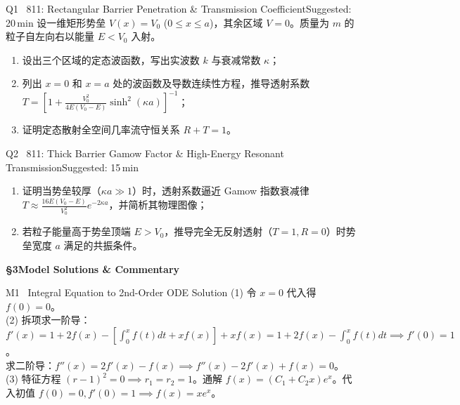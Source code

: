 \documentclass[a4paper,11pt]{article}
\begin{document}
\vspace{3pt}

\begin{problem}{Q1 \textbar\ 811: Rectangular Barrier Penetration \& Transmission Coefficient}{Suggested: 20\,min}
设一维矩形势垒 $V(x) = V_0$ ($0 \le x \le a$)，其余区域 $V=0$。质量为 $m$ 的粒子自左向右以能量 $E < V_0$ 入射。
\begin{enumerate}[leftmargin=1.5em,itemsep=1pt,topsep=1pt]
  \item 设出三个区域的定态波函数，写出实波数 $k$ 与衰减常数 $\kappa$；
  \item 列出 $x=0$ 和 $x=a$ 处的波函数及导数连续性方程，推导透射系数 $T = \left[1 + \frac{V_0^2}{4E(V_0-E)}\sinh^2(\kappa a)\right]^{-1}$；
  \item 证明定态散射全空间几率流守恒关系 $R + T = 1$。
\end{enumerate}
\end{problem}

\vspace{3pt}

\begin{problem}{Q2 \textbar\ 811: Thick Barrier Gamow Factor \& High-Energy Resonant Transmission}{Suggested: 15\,min}
\begin{enumerate}[leftmargin=1.5em,itemsep=1pt,topsep=1pt]
  \item 证明当势垒较厚（$\kappa a \gg 1$）时，透射系数逼近 Gamow 指数衰减律 $T \approx \frac{16E(V_0-E)}{V_0^2}e^{-2\kappa a}$，并简析其物理图像；
  \item 若粒子能量高于势垒顶端 $E > V_0$，推导完全无反射透射（$T=1, R=0$）时势垒宽度 $a$ 满足的共振条件。
\end{enumerate}
\end{problem}

\clearpage

{\Large\sffamily\bfseries\color{navy} \S 3\quad Model Solutions \& Commentary}

\vspace{2pt}

\begin{solution}{M1 \textperiodcentered\ Integral Equation to 2nd-Order ODE Solution}
(1) 令 $x=0$ 代入得 $f(0) = 0$。\\
(2) 拆项求一阶导：$f'(x) = 1 + 2f(x) - [\int_0^x f(t)dt + xf(x)] + xf(x) = 1 + 2f(x) - \int_0^x f(t)dt \implies f'(0)=1$。\\
求二阶导：$f''(x) = 2f'(x) - f(x) \implies f''(x) - 2f'(x) + f(x) = 0$。\\
(3) 特征方程 $(r-1)^2 = 0 \implies r_1=r_2=1$。通解 $f(x)=(C_1+C_2 x)e^x$。代入初值 $f(0)=0, f'(0)=1 \implies f(x) = x e^x$。
\end{solution}
\end{document}
